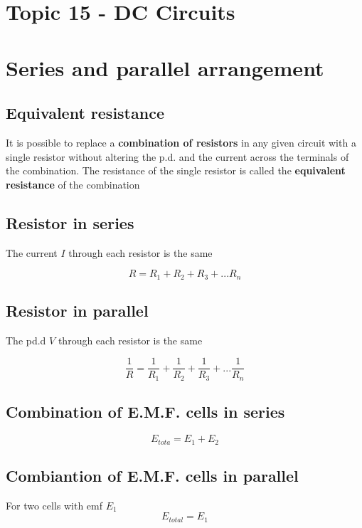 \documentclass[a4paper, 10pt]{article}
\begin{document}
\section*{Topic 15 - DC Circuits}

\section{Series and parallel arrangement}
\subsection{Equivalent resistance}
\begin{framed}
   It is possible to replace a \textbf{combination of resistors} in any given circuit with a single resistor without altering the p.d. and the current across the terminals of the combination. The resistance of the single resistor is called the \textbf{equivalent resistance} of the combination
\end{framed}	

\subsection{Resistor in series}
The current $I$ through each resistor is the same
\begin{center}
   \begin{framed}
      \[
      R = R_1 + R_2 + R_3 + ... R_n
      \]
      
   \end{framed}	
\end{center}	

\subsection{Resistor in parallel}
The pd.d $V$ through each resistor is the same
\begin{center}
   \begin{framed}
      \[
      \frac{1}{R} = \frac{1}{R_1} + \frac{1}{R_2}+ \frac{1}{R_3 }+ ... \frac{1}{R_n}
      \]
   \end{framed}	
\end{center}	

\subsection{Combination of E.M.F. cells in series}
\[
   E_{tota} = E_1 + E_2
\]

\subsection{Combiantion of E.M.F. cells in parallel}
For two cells with emf $E_1$ 
\[
   E_{total} = E_1
\]
\end{document}
